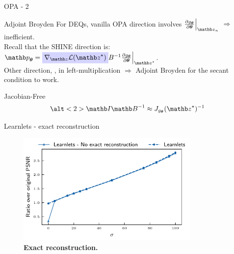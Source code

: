 \begin{frame}{OPA - 2}
\begin{center}
{\begin{algorithm}[H]
{            
        }
        \KwOut{$\zb^\star$, $\Bb$}
    \end{algorithm}
    }
    \end{center}
\end{frame}

\begin{frame}{Adjoint Broyden}
    For DEQs, vanilla OPA direction involves $\frac{\partial g_{\thetab}}{\partial \thetab}\Bigr|_{\zb_n}$ $\Rightarrow$ inefficient.\\

    Recall that the SHINE direction is: $\pb_\thetab =  \highlight{blue}{$\nabla_\zb \mathcal{L}(\zb^\star)$} B^{-1} \frac{\partial g_{\thetab}}{\partial \thetab}\Bigr|_{\zb^\star}$.\\
    Other direction, , in left-multiplication $\Rightarrow$ Adjoint Broyden for the secant condition to work.
\end{frame}

\begin{frame}{Jacobian-Free}
    \begin{equation*}
        \alt<2>{\Ib}{\Bb^{-1}} \approx J_{g_{\thetab}}(\zb^\star)^{-1}
    \end{equation*}
\end{frame}

\begin{frame}{Learnlets - exact reconstruction}
    \begin{figure}[ht]
        \includegraphics[width=0.8\textwidth]{Figures/clinic_applic/learnlets_exact_recon.pdf}
        \caption{\label{fig:comparison-exact-reco}\textbf{Exact reconstruction.}}
        \end{figure}
\end{frame}

\begin{frame}

\end{frame}
